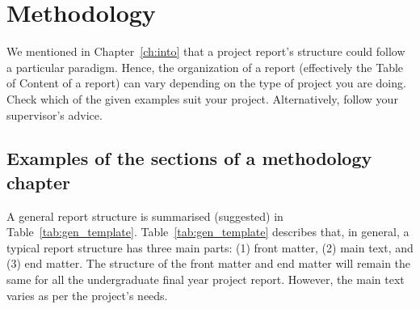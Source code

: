 \chapter{Methodology}
\label{ch:method} %

We mentioned in Chapter~\ref{ch:into} %
that a project report's structure could follow a particular paradigm. Hence, the organization of a report (effectively the Table of Content of a report) can vary depending on the type of project you are doing. Check which of the given examples suit your project. Alternatively, follow your supervisor's advice.

\section{Examples of the sections of a methodology chapter}
A general report structure is summarised (suggested) in Table~\ref{tab:gen_template}. Table~\ref{tab:gen_template} describes that, in general, a typical report structure has three main parts: (1) front matter, (2) main text, and (3) end matter. %
The structure of the front matter and end matter will remain the same for all the undergraduate final year project report. However, the main text varies as per the project's needs.
